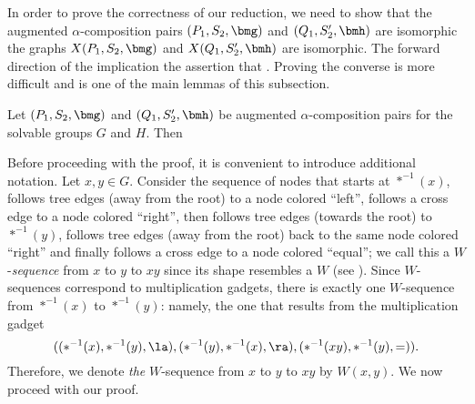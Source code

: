 In order to prove the correctness of our reduction, we need to show that the augmented $\alpha$-composition pairs $(P_1, S_2, \bmg)$ and $(Q_1, S_2', \bmh)$ are isomorphic \ifft the graphs $X(P_1, S_2, \bmg)$ and $X(Q_1, S_2', \bmh)$ are isomorphic.  The forward direction of the implication  the assertion that .  Proving the converse is more difficult and is one of the main lemmas of this subsection.



\begin{lemma}
  \label{lem:X-functor}
  Let $(P_1, S_2, \bmg)$ and $(Q_1, S_2', \bmh)$ be augmented $\alpha$-composition pairs for the solvable groups $G$ and $H$.  Then 
\end{lemma}

Before proceeding with the proof, it is convenient to introduce additional notation.  Let $x, y \in G$.  Consider the sequence of nodes that starts at $*^{-1}(x)$, follows tree edges (away from the root) to a node colored ``left'', follows a cross edge to a node colored ``right'', then follows tree edges (towards the root) to $*^{-1}(y)$, follows tree edges (away from the root) back to the same node colored ``right'' and finally follows a cross edge to a node colored ``equal''; we call this a $W$-\emph{sequence} from $x$ to $y$ to $x y$ since its shape resembles a $W$ (see ).  Since $W$-sequences correspond to multiplication gadgets, there is exactly one $W$-sequence from $*^{-1}(x)$ to $*^{-1}(y)$: namely, the one that results from the multiplication gadget
\begin{equation*}
  ((*^{-1}(x), *^{-1}(y), \la), (*^{-1}(y), *^{-1}(x), \ra), (*^{-1}(x y), *^{-1}(y), =)).
\end{equation*}
Therefore, we denote \emph{the} $W$-sequence from $x$ to $y$ to $x y$ by $W(x, y)$.  We now proceed with our proof.

